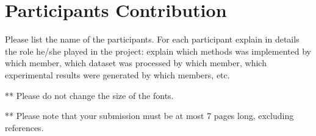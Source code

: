 \documentclass[11.5pt]{article}
\begin{document}
    \section{Participants Contribution}
    Please list the name of the participants. For each participant explain in details the role he/she played in the project: explain which methods was implemented by which member, which dataset was processed by which member, which experimental results were generated by which members, etc.

    \vspace{10mm}
    ** Please do not change the size of the fonts.

    ** Please note that your submission must be at most 7 pages long, excluding references.

    \newpage
    
    {}
    

    
\end{document}
